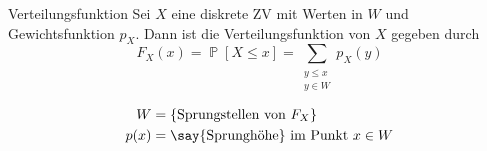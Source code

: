 \documentclass[a4paper,10pt]{article}
\def\F{\mathcal{F}}
\renewcommand{\P}{\operatorname{\mathbb{P}}}
\DeclareMathOperator{\Ber}{Ber}
\numberwithin{equation}{section}
\begin{document}


\begin{mainbox}{Verteilungsfunktion}
    Sei \( X \) eine diskrete ZV mit Werten in \( W \) und Gewichtsfunktion \( p_X \). Dann ist die Verteilungsfunktion von \( X \) gegeben durch
    \begin{equation}
        F_X(x) = \P[X \leq x] = \sum_{\substack{y \leq x \\ y \in W}} p_X(y)
        \label{eq:distribution_given_density}
    \end{equation}
\end{mainbox}


\begin{align*}
    W &= \{\text{Sprungstellen von } F_X\} \\
    p(x) &= \text{\say{Sprunghöhe} im Punkt } x \in W
\end{align*}


\end{document}
